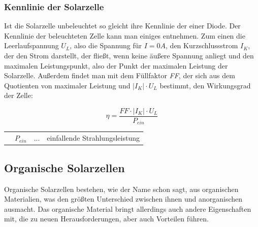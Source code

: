\documentclass[slug=SZ, room=Hermann-Krone-Bau\,\ Labor\ 1.25, supervisor=Martin\ Kroll]{../../Lab_Report_LaTeX/lab_report}
\begin{document}
\subsubsection{Kennlinie der Solarzelle}

Ist die Solarzelle unbeleuchtet so gleicht ihre Kennlinie der einer Diode.
Der Kennlinie der beleuchteten Zelle kann man einiges entnehmen.
Zum einen die Leerlaufspannung \(U_L\), also die Spannung für \(I=0 A\), den Kurzschlussstrom \(I_K\), der den
Strom darstellt, der fließt, wenn keine äußere Spannung anliegt und den maximalen Leistungspunkt, also der Punkt
der maximalen Leistung der Solarzelle. Außerdem findet man mit dem Füllfaktor \emph{FF}, der sich aus dem
Quotienten von maximaler Leistung und \(|I_K| \cdot U_L\) bestimmt, den Wirkungsgrad der Zelle:

\begin{equation}\label{eq:wirkgrad}
        \eta = \frac{FF \cdot |I_K| \cdot U_L}{P_{ein}}
\end{equation}

\begin{tabular}{llll}
         & \(P_{ein}\) & ... & einfallende Strahlungsleistung
\end{tabular}

\subsection{Organische Solarzellen}
\label{sec:orgsolar}

Organische Solarzellen bestehen, wie der Name schon sagt, aus organischen Materialien, was den größten
Unterschied zwischen ihnen und anorganischen ausmacht.
Das organische Material bringt allerdings auch andere Eigenschaften mit, die zu neuen Herausforderungen, aber
auch Vorteilen führen.\\
\end{document}
